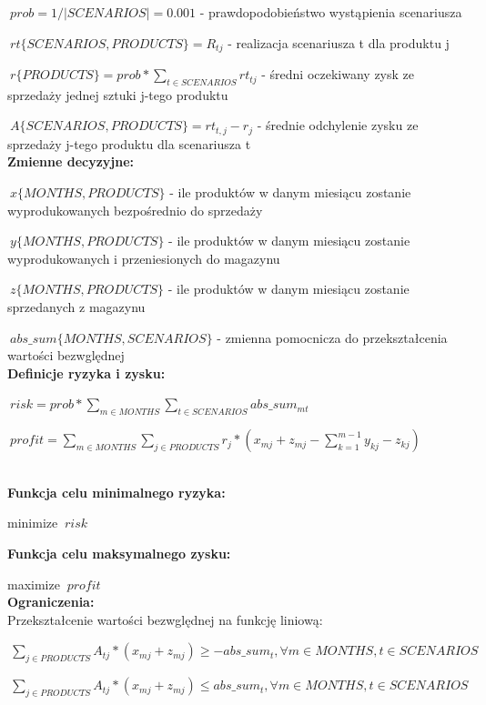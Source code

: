 \documentclass[11pt]{article} %
\begin{document}
$\ prob = 1/|SCENARIOS| = 0.001 $ - prawdopodobieństwo wystąpienia scenariusza

$\ rt\{SCENARIOS, PRODUCTS\} = R_{tj} $ - realizacja scenariusza t dla produktu j

$\ r\{ PRODUCTS\} = prob *\sum_{t \in SCENARIOS} rt_{tj} $ - średni oczekiwany zysk ze sprzedaży jednej sztuki j-tego produktu 

$\ A\{SCENARIOS, PRODUCTS\} = rt_{t,j} - r_{j} $ - średnie odchylenie zysku ze sprzedaży j-tego produktu dla scenariusza t
\leavevmode \\

\textbf{Zmienne decyzyjne:}

$\ x\{MONTHS, PRODUCTS\} $ - ile produktów w danym miesiącu zostanie wyprodukowanych bezpośrednio do sprzedaży

$\ y\{MONTHS, PRODUCTS\} $ - ile produktów w danym miesiącu zostanie wyprodukowanych i przeniesionych do magazynu

$\ z\{MONTHS, PRODUCTS\} $ - ile produktów w danym miesiącu zostanie sprzedanych z magazynu

$\ abs\_sum\{MONTHS, SCENARIOS\} $ - zmienna pomocnicza do przekształcenia wartości bezwględnej 
\leavevmode \\

\textbf{Definicje ryzyka i zysku:}
\begin{center}
$\ risk = prob * \sum_{m \in MONTHS } \sum_{t \in SCENARIOS } abs\_sum_{mt} $

$\ profit = \sum_{m \in MONTHS } \sum_{j \in PRODUCTS} r_{j} * ( x_{mj} + z_{mj} - \sum_{k = 1}^{m-1} y_{kj} - z_{kj}) $
\end{center}
\leavevmode \\

\textbf{Funkcja celu minimalnego ryzyka:}

minimize $\ risk $

\textbf{Funkcja celu maksymalnego zysku:}

maximize $\ profit $
\leavevmode \\

\textbf{Ograniczenia:}
\leavevmode \\

Przekształcenie wartości bezwględnej na funkcję liniową:

$\  \sum_{j \in PRODUCTS} A_{tj} * (x_{mj} + z_{mj}) \geqslant - abs\_sum_t, 
\forall m \in MONTHS,  t \in SCENARIOS $

$\  \sum_{j \in PRODUCTS} A_{tj} * (x_{mj} + z_{mj}) \leqslant abs\_sum_t, 
\forall m \in MONTHS, t \in SCENARIOS $
\leavevmode \\
\end{document}
